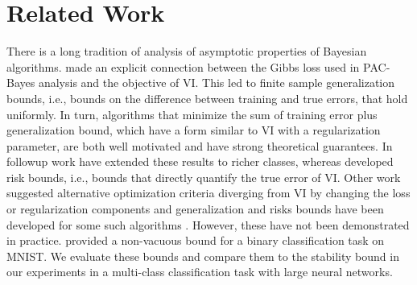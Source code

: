 \section{Related Work}
There is a long tradition of analysis of asymptotic properties of Bayesian algorithms. 
\cite{Alquier2016properties} made an explicit connection between the Gibbs loss used in PAC-Bayes analysis and the objective of VI. This led to finite sample generalization bounds, i.e., bounds on the difference between training and true errors, that hold uniformly. In turn, algorithms that minimize the sum of training error plus generalization bound,
which have a form similar to VI with a regularization parameter,
are both well motivated and have strong theoretical guarantees. 
In followup work
\cite{Germain2016pac,Germain2019} have extended these results to richer classes, whereas \cite{Sheth2017} developed risk bounds, i.e., bounds that directly quantify the true error of VI. 
Other work suggested alternative optimization criteria diverging from VI by changing the loss or regularization components
\cite[e.g.,][]{black-box-alpha,knoblauch2019generalized,dlm-sgp} and generalization and risks bounds have been developed for some such algorithms 
\citep{Sheth2019,Germain2019,Masegosa20,pac-m}. 
However, these have not been demonstrated in practice.
\citet{nonvacuous} provided a non-vacuous bound for a binary classification task on MNIST. 
We evaluate these bounds and compare them to the stability bound
in our experiments in a multi-class classification task with large neural networks.

